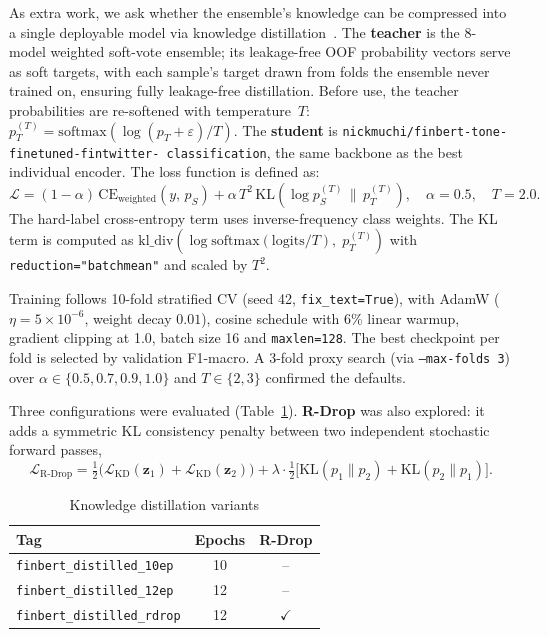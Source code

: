 \documentclass[11pt,a4paper]{article}
\begin{document}
As extra work, we ask whether the ensemble's knowledge can be compressed into a
single deployable model via knowledge distillation~\cite{hinton2015distilling}.
The \textbf{teacher} is the 8-model weighted soft-vote ensemble; its leakage-free OOF probability vectors serve as soft
targets, with each sample's target drawn from folds the ensemble never trained
on, ensuring fully leakage-free distillation.
Before use, the teacher probabilities are re-softened with temperature~$T$:
$p_T^{(T)}=\mathrm{softmax}\!\left(\log(p_T+\varepsilon)/T\right)$.
The \textbf{student} is \texttt{nickmuchi/finbert-tone-finetuned-fintwitter-%
classification}, the same backbone as the best individual encoder. The loss function is defined as:
\[
\mathcal{L}
= (1-\alpha)\,\mathrm{CE}_{\mathrm{weighted}}(y,\,p_S)
+ \alpha\,T^{2}\,
  \mathrm{KL}\!\left(\log p_S^{(T)}\,\Big\|\,p_T^{(T)}\right),
\quad \alpha=0.5,\quad T=2.0.
\]
The hard-label cross-entropy term uses inverse-frequency class weights.
The KL term is computed as
$\mathrm{kl\_div}(\log\mathrm{softmax}(\mathrm{logits}/T),\;p_T^{(T)})$
with \texttt{reduction="batchmean"} and scaled by $T^{2}$.

Training follows 10-fold stratified CV (seed 42, \texttt{fix\_text=True}), with AdamW ($\eta=5\times10^{-6}$,
weight decay $0.01$), cosine schedule with 6\% linear warmup, gradient
clipping at 1.0, batch size 16 and \texttt{maxlen=128}.
The best checkpoint per fold is selected by validation F1-macro.
A 3-fold proxy search (via \texttt{--max-folds 3}) over
$\alpha\in\{0.5,0.7,0.9,1.0\}$ and $T\in\{2,3\}$ confirmed the defaults.

Three configurations were evaluated (Table~\ref{tab:distill}).
\textbf{R-Drop} was also explored: it adds a symmetric KL consistency penalty between two independent stochastic forward passes,
\[
\mathcal{L}_{\mathrm{R\text{-}Drop}}
= \tfrac{1}{2}\bigl(\mathcal{L}_{\mathrm{KD}}(\mathbf{z}_1)
                   +\mathcal{L}_{\mathrm{KD}}(\mathbf{z}_2)\bigr)
+ \lambda\cdot\tfrac{1}{2}
  \bigl[\mathrm{KL}(p_1\|p_2)+\mathrm{KL}(p_2\|p_1)\bigr].
\]

\begin{table}[H]
\centering
\caption{Knowledge distillation variants}
\label{tab:distill}
\begin{tabular}{lcc}
\hline
\textbf{Tag} & \textbf{Epochs} & \textbf{R-Drop} \\
\hline
\texttt{finbert\_distilled\_10ep}   & 10 & --     \\
\texttt{finbert\_distilled\_12ep}   & 12 & --     \\
\texttt{finbert\_distilled\_rdrop}  & 12 & $\checkmark$  \\
\hline
\end{tabular}
\end{table}
\end{document}
